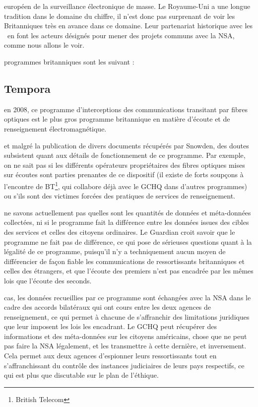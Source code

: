  européen de la surveillance électronique de
masse. Le Royaume-Uni a une longue tradition dans le domaine du chiffre, il
n'est donc pas surprenant de voir les Britanniques très en avance dans ce
domaine. Leur partenariat historique avec les \EUA~en font les acteurs
désignés pour mener des projets communs avec la NSA, comme nous allons le voir.

 programmes britanniques sont les suivant :

\subsection{Tempora}

 en 2008, ce programme d'interceptions des
communications transitant par fibres optiques est le plus gros programme
britannique en matière d'écoute et de renseignement électromagnétique.

 et malgré la publication de divers documents
récupérés par Snowden, des doutes subsistent quant aux détails de fonctionnement
de ce programme. Par exemple, on ne sait pas si les différents opérateurs
propriétaires des fibres optiques mises sur écoutes sont parties prenantes de ce
dispositif (il existe de forts soupçons à l'encontre de BT\footnote{British
Telecom}, qui collabore déjà avec le GCHQ dans d'autres programmes) ou s'ils
sont des victimes forcées des pratiques de services de renseignement.

 ne savons actuellement pas quelles sont les
quantités de données et méta-données collectées, ni si le programme fait la
différence entre les données issues des cibles des services et celles des
citoyens ordinaires. Le Guardian croit savoir\autocite{Tempora} que le programme ne
fait pas de différence, ce qui pose de sérieuses questions quant à la légalité
de ce programme, puisqu'il n'y a techniquement aucun moyen de différencier de
façon fiable les communications de ressortissants britanniques et celles des
étrangers, et que l'écoute des premiers n'est pas encadrée par les mêmes lois
que l'écoute des seconds. 

 cas, les données recueillies par ce programme sont
échangées avec la NSA dans le cadre des accords bilatéraux qui ont cours entre
les deux agences de renseignement, ce qui permet à chacune de s'affranchir des
limitations juridiques que leur imposent les lois les encadrant. Le GCHQ peut
récupérer des informations et des méta-données sur les citoyens américains,
chose que ne peut pas faire la NSA légalement, et les transmettre à cette
dernière, et inversement\autocite{echange}. Cela permet aux deux agences d'espionner
leurs ressortissants tout en s'affranchissant du contrôle des instances
judiciaires de leurs pays respectifs, ce qui est plus que discutable sur le plan
de l'éthique.

